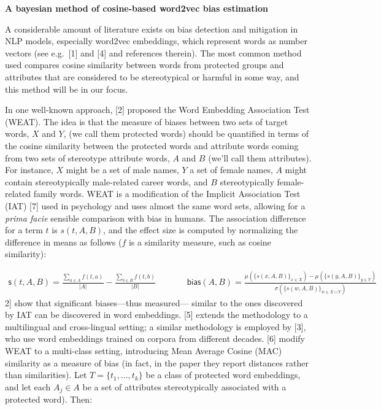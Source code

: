 \documentclass[12pt,dvipsnames,enabledeprecatedfontcommands]{scrartcl}
\author{}
\date{\vspace{-2.5em}}
\begin{document}
\begin{center}
\Large \textbf{A bayesian method of cosine-based word2vec bias estimation}
\end{center}

\vspace{1mm}

A considerable amount of literature exists on bias detection and
mitigation in NLP models, especially word2vec embeddings, which
represent words as number vectors (see e.g.~{[}1{]} and {[}4{]} and
references therein). The most common method used compares cosine
similarity between words from protected groups and attributes that are
considered to be stereotypical or harmful in some way, and this method
will be in our focus.

In one well-known approach, {[}2{]} proposed the Word Embedding
Association Test (WEAT). The idea is that the measure of biases between
two sets of target words, \(X\) and \(Y\), (we call them protected
words) should be quantified in terms of the cosine similarity between
the protected words and attribute words coming from two sets of
stereotype attribute words, \(A\) and \(B\) (we'll call them
attributes). For instance, \(X\) might be a set of male names, \(Y\) a
set of female names, \(A\) might contain stereotypically male-related
career words, and \(B\) stereotypically female-related family words.
WEAT is a modification of the Implicit Association Test (IAT) {[}7{]}
used in psychology and uses almost the same word sets, allowing for a
\emph{prima facie} sensible comparison with bias in humans. The
association difference for a term \(t\) is \(s(t,A,B)\), and the effect
size is computed by normalizing the difference in means as follows
(\(f\) is a similarity measure, such as cosine similarity):

\vspace{-3mm}

\footnotesize \begin{align}
\mathsf{s}(t,A,B)  = \frac{\sum_{a\in A}f(t,a)}{\vert A\vert} - \frac{\sum_{b\in B}f(t,b)}{\vert B\vert}
& \,\,\,\,\,\,\,\,\,\,\,\,\,\,\,\,\,
\mathsf{bias}(A,B)  = \frac{
\mu(\{s(x,A,B)\}_{x\in X}) -\mu(\{s(y,A,B)\}_{y\in Y}) 
}{
\sigma(\{s(w,A,B)\}_{w\in X\cup Y})
} \tag{WEAT}
\end{align} \normalsize \noindent {[}2{]} show that significant
biases---thus measured--- similar to the ones discovered by IAT can be
discovered in word embeddings. {[}5{]} extends the methodology to a
multilingual and cross-lingual setting; a similar methodology is
employed by {[}3{]}, who use word embeddings trained on corpora from
different decades. {[}6{]} modify WEAT to a multi-class setting,
introducing Mean Average Cosine (MAC) similarity as a measure of bias
(in fact, in the paper they report distances rather than similarities).
Let \(T = \{t_1, \dots, t_k\}\) be a class of protected word embeddings,
and let each \(A_j\in A\) be a set of attributes stereotypically
associated with a protected word). Then:
\end{document}

